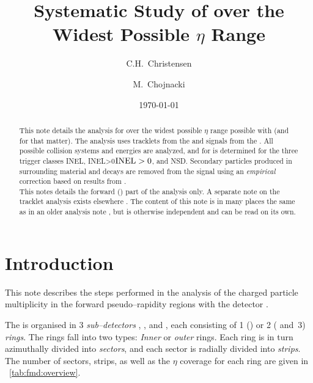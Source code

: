 \documentclass[compat,11pt]{alicenote}
\title{Systematic Study of \ndndeta{} over the Widest Possible $\eta$
  Range}
\institute{1}{Niels Bohr Institute}
\author[C.H.~Christensen \emph{et al}]{%
  C.H.~Christensen\inst[*]{} \and 
  M.~Chojnacki\inst{1}}
\date{\today}
\DeclareRobustCommand{\AlwaysText}[1]{\ifmmode\relax\text{#1}\else #1\fi}
\newcommand*\INEL{\AlwaysText{INEL}}
\newcommand*\NSD{\AlwaysText{NSD}}
\newcommand*\INELGT{\ifmmode\INEL>0\else$\INEL>0$\fi}
\let\INELGt\INELGT
\begin{document}
\maketitle{}
\renewcommand*{\thefootnote}{\arabic{footnote}}
\begin{abstract}
  \noindent
  This note details the analysis for \ndndeta{} over the widest possible
  $\eta$ range possible with \ALICE{} (and \LHC{} for that matter).
  The analysis uses tracklets from the \SPD{} and signals from the
  \FMD{}.  All possible collision systems and energies are analyzed,
  and for \ppCol{} \ndndeta{} is determined for the three trigger
  classes \INEL{}, \INELGt{}, and \NSD{}.  Secondary particles
  produced in surrounding material and decays are removed from the
  \FMD{} signal using an \emph{empirical} correction based on results
  from \cite{Abbas:2013bpa}. \\
  
  \noindent
  This notes details the forward (\FMD{}) part of the analysis only.
  A separate note on the \SPD{} tracklet analysis exists elsewhere
  \cite{spdnote}.  The content of this note is in many places the same
  as in an older analysis note \cite{oldnote}, but is otherwise
  independent and can be read on its own.
\end{abstract}

\cleardoublepage
\tableofcontents 

\cleardoublepage

\section{Introduction}

This note describes the steps performed in the analysis of the
charged particle multiplicity in the forward pseudo--rapidity regions
with the \FMD{} detector \cite{FWD:2004mz,cholm:2009}. 

The \FMD{} is organised in 3 \emph{sub--detectors} , ,
and , each consisting of 1 () or 2 ( and~3)
\emph{rings}.  The rings fall into two types: \emph{Inner} or
\emph{outer} rings.  Each ring is in turn azimuthally divided into
\emph{sectors}, and each sector is radially divided into
\emph{strips}.  The number of sectors, strips, as well as the $\eta$
coverage for each ring are given in \tablename~\ref{tab:fmd:overview}.
\end{document}
